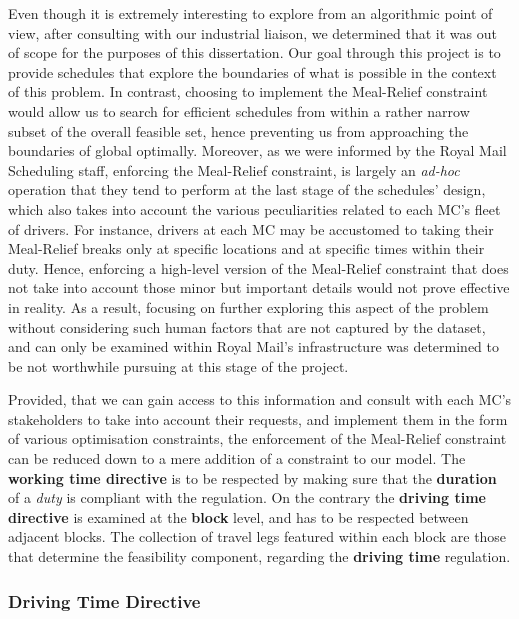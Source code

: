 \vspace{\baselineskip}
\noindent
Even though it is extremely interesting to explore from an algorithmic point of view, after consulting with our industrial liaison, we determined that it was out of scope for the purposes of this dissertation. Our goal through this project is to provide schedules that explore the boundaries of what is possible in the context of this problem. In contrast, choosing to implement the Meal-Relief constraint would allow us to search for efficient schedules from within a rather narrow subset of the overall feasible set, hence preventing us from approaching the boundaries of global optimally. Moreover, as we were informed by the Royal Mail Scheduling staff, enforcing the Meal-Relief constraint, is largely an \textit{ad-hoc} operation that they tend to perform at the last stage of the schedules' design, which also takes into account the various peculiarities related to each MC's fleet of drivers. For instance, drivers at each MC may be accustomed to taking their Meal-Relief breaks only at specific locations and at specific times within their duty. Hence, enforcing a high-level version of the Meal-Relief constraint that does not take into account those minor but important details would not prove effective in reality. As a result, focusing on further exploring this aspect of the problem without considering such human factors that are not captured by the dataset, and can only be examined within Royal Mail's infrastructure was determined to be not worthwhile pursuing at this stage of the project. 

\vspace{\baselineskip}
\noindent
Provided, that we can gain access to this information and consult with each MC's stakeholders to take into account their requests, and implement them in the form of various optimisation constraints, the enforcement of the Meal-Relief constraint can be reduced down to a mere addition of a constraint to our model. The \textbf{working time directive} is to be respected by making sure that the \textbf{duration} of a \textit{duty} is compliant with the regulation. On the contrary the \textbf{driving time directive} is examined at the \textbf{block} level, and has to be respected between adjacent blocks.  The collection of travel legs featured within each block are those that determine the feasibility component, regarding the \textbf{driving time} regulation. 

\subsubsection*{Driving Time Directive}

